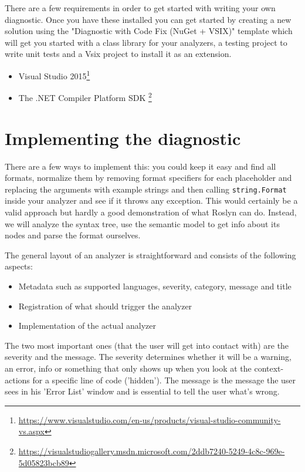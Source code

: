 There are a few requirements in order to get started with writing your own diagnostic. Once you have these installed you can get started by creating a new solution using the "Diagnostic with Code Fix (NuGet + VSIX)" template which will get you started with a class library for your analyzers, a testing project to write unit tests and a Vsix project to install it as an extension.

\begin{itemize}
\item Visual Studio 2015\footnote{\url{https://www.visualstudio.com/en-us/products/visual-studio-community-vs.aspx}}
\item The .NET Compiler Platform SDK \footnote{\url{https://visualstudiogallery.msdn.microsoft.com/2ddb7240-5249-4c8c-969e-5d05823bcb89}}
\end{itemize}

\section{Implementing the diagnostic}
\label{sec:diagnostic-implementing}

There are a few ways to implement this: you could keep it easy and find all formats, normalize them by removing format specifiers for each placeholder and replacing the arguments with example strings and then calling \texttt{string.Format} inside your analyzer and see if it throws any exception. This would certainly be a valid approach but hardly a good demonstration of what Roslyn can do. Instead, we will analyze the syntax tree, use the semantic model to get info about its nodes and parse the format ourselves.

The general layout of an analyzer is straightforward and consists of the following aspects:

\begin{itemize}
\item Metadata such as supported languages, severity, category, message and title
\item Registration of what should trigger the analyzer
\item Implementation of the actual analyzer
\end{itemize}

The two most important ones (that the user will get into contact with) are the severity and the message. The severity determines whether it will be a warning, an error, info or something that only shows up when you look at the context-actions for a specific line of code ('hidden'). The message is the message the user sees in his 'Error List' window and is essential to tell the user what's wrong.

